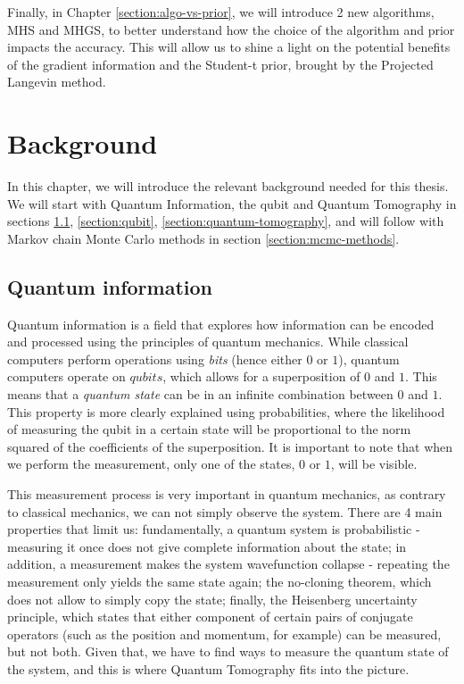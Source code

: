 \documentclass[12pt]{memoir}
\begin{document}
Finally, in Chapter \ref{section:algo-vs-prior}, we will introduce 2 new algorithms, MHS and MHGS, to better understand how the choice of the algorithm and prior impacts the accuracy. This will allow us to shine a light on the potential benefits of the gradient information and the Student-t prior, brought by the Projected Langevin method.



\chapter{Background}\label{section:background}


In this chapter, we will introduce the relevant background needed for this thesis. We will start with Quantum Information, the qubit and Quantum Tomography in sections \ref{section:quantum-information}, \ref{section:qubit}, \ref{section:quantum-tomography}, and will follow with Markov chain Monte Carlo methods in section \ref{section:mcmc-methods}.


\section{Quantum information}\label{section:quantum-information}


Quantum information is a field that explores how information can be encoded and processed using the principles of quantum mechanics. While classical computers perform operations using \textit{bits} (hence either $0$ or $1$), quantum computers operate on $qubits$, which allows for a superposition of $0$ and $1$. This means that a \textit{quantum state} can be in an infinite combination between $0$ and $1$. This property is more clearly explained using probabilities, where the likelihood of measuring the qubit in a certain state will be proportional to the norm squared of the coefficients of the superposition. It is important to note that when we perform the measurement, only one of the states, $0$ or $1$, will be visible.\medbreak


This measurement process is very important in quantum mechanics, as contrary to classical mechanics, we can not simply observe the system. There are 4 main properties that limit us: fundamentally, a quantum system is probabilistic - measuring it once does not give complete information about the state; in addition, a measurement makes the system wavefunction collapse - repeating the measurement only yields the same state again; the no-cloning theorem, which does not allow to simply copy the state; finally, the Heisenberg uncertainty principle, which states that either component of certain pairs of conjugate operators (such as the position and momentum, for example) can be measured, but not both. Given that, we have to find ways to measure the quantum state of the system, and this is where Quantum Tomography fits into the picture.
\end{document}
